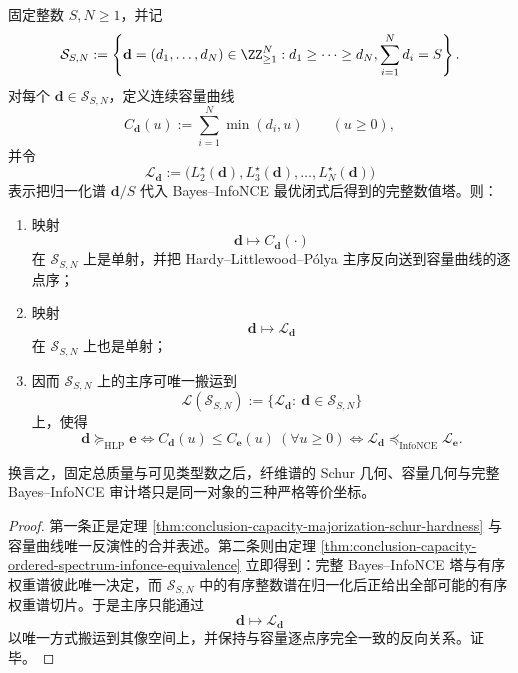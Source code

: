 \begin{corollary}\label{cor:conclusion-capacity-majorization-infonce-antiisomorphism}
固定整数 \(S,N\ge 1\)，并记
\[
\mathcal S_{S,N}
:=
\left\{
\mathbf d=(d_1,\dots,d_N)\in \ZZ_{\ge 1}^N:
d_1\ge \cdots\ge d_N,
\sum_{i=1}^{N}d_i=S
\right\}.
\]
对每个 \(\mathbf d\in \mathcal S_{S,N}\)，定义连续容量曲线
\[
C_{\mathbf d}(u):=\sum_{i=1}^{N}\min(d_i,u)
\qquad (u\ge 0),
\]
并令
\[
\mathscr L_{\mathbf d}
:=
\bigl(L_{2}^{\star}(\mathbf d),L_{3}^{\star}(\mathbf d),\dots,L_{N}^{\star}(\mathbf d)\bigr)
\]
表示把归一化谱 \(\mathbf d/S\) 代入 Bayes--InfoNCE 最优闭式后得到的完整数值塔。则：
\begin{enumerate}
  \item 映射
  \[
  \mathbf d\longmapsto C_{\mathbf d}(\cdot)
  \]
  在 \(\mathcal S_{S,N}\) 上是单射，并把 Hardy--Littlewood--P\'olya 主序反向送到容量曲线的逐点序；
  \item 映射
  \[
  \mathbf d\longmapsto \mathscr L_{\mathbf d}
  \]
  在 \(\mathcal S_{S,N}\) 上也是单射；
  \item 因而 \(\mathcal S_{S,N}\) 上的主序可唯一搬运到
  \[
  \mathscr L(\mathcal S_{S,N})
  :=
  \{\mathscr L_{\mathbf d}:\ \mathbf d\in \mathcal S_{S,N}\}
  \]
  上，使得
  \[
  \mathbf d\succcurlyeq_{\mathrm{HLP}}\mathbf e
  \iff
  C_{\mathbf d}(u)\le C_{\mathbf e}(u)\ (\forall u\ge 0)
  \iff
  \mathscr L_{\mathbf d}\preccurlyeq_{\mathrm{InfoNCE}}\mathscr L_{\mathbf e}.
  \]
\end{enumerate}
换言之，固定总质量与可见类型数之后，纤维谱的 Schur 几何、容量几何与完整 Bayes--InfoNCE 审计塔只是同一对象的三种严格等价坐标。
\end{corollary}
\begin{proof}
第一条正是定理 \ref{thm:conclusion-capacity-majorization-schur-hardness} 与容量曲线唯一反演性的合并表述。第二条则由定理 \ref{thm:conclusion-capacity-ordered-spectrum-infonce-equivalence} 立即得到：完整 Bayes--InfoNCE 塔与有序权重谱彼此唯一决定，而 \(\mathcal S_{S,N}\) 中的有序整数谱在归一化后正给出全部可能的有序权重谱切片。于是主序只能通过
\[
\mathbf d\longmapsto \mathscr L_{\mathbf d}
\]
以唯一方式搬运到其像空间上，并保持与容量逐点序完全一致的反向关系。证毕。
\end{proof}

